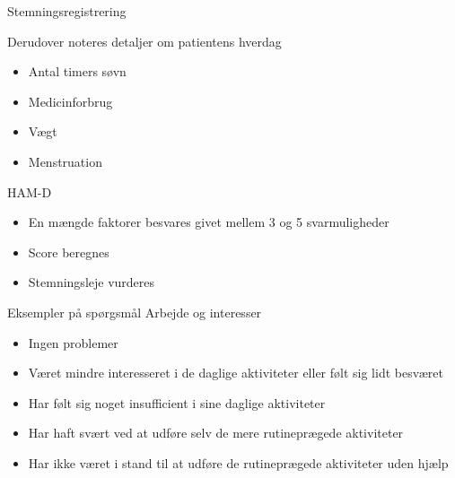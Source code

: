 {\aauwavesbg%
	\begin{frame}{Stemningsregistrering} %
		
		Derudover noteres detaljer om patientens hverdag
		\begin{itemize}
			\item Antal timers søvn
			\item Medicinforbrug
			\item Vægt
			\item Menstruation
		\end{itemize}
	\end{frame}}
	
{\aauwavesbg%
\begin{frame}{HAM-D} %
	\begin{itemize}
		\item En mængde faktorer besvares givet mellem 3 og 5 svarmuligheder
		\item Score beregnes
		\item Stemningsleje vurderes
	\end{itemize}
	
\end{frame}}
	
{\aauwavesbg%
	\begin{frame}{Eksempler på spørgsmål} %
		 Arbejde og interesser
		\begin{itemize}
			\item Ingen problemer
			\item Været mindre interesseret i de daglige aktiviteter eller følt sig lidt besværet
			\item Har følt sig noget insufficient i sine daglige aktiviteter
			\item Har haft svært ved at udføre selv de mere rutineprægede aktiviteter
			\item Har ikke været i stand til at udføre de rutineprægede aktiviteter uden hjælp
		\end{itemize}
		
	\end{frame}}

